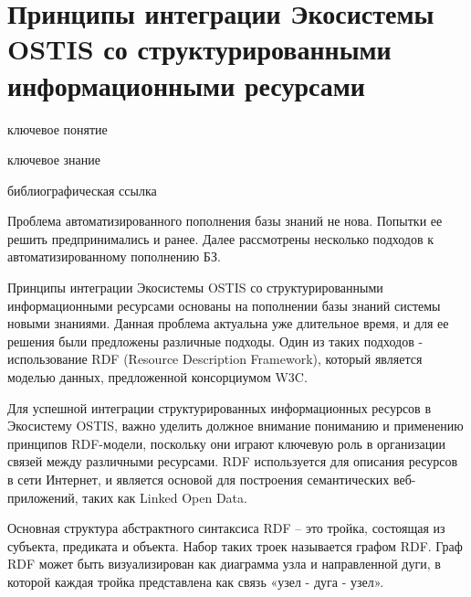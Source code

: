 \section{Принципы интеграции Экосистемы OSTIS со структурированными информационными ресурсами}
{\label{sec_integration_resources}} 

\begin{SCn}

    \bigskip
    
    \begin{scnrelfromlist}{ключевое понятие}
    \end{scnrelfromlist}
    
    \bigskip
    
    \begin{scnrelfromlist}{ключевое знание}
    \end{scnrelfromlist}
    
    \bigskip
    
    \begin{scnrelfromlist}{библиографическая ссылка}
    \end{scnrelfromlist}
    
    \end{SCn}

Проблема автоматизированного пополнения базы знаний не нова. Попытки ее решить предпринимались и ранее. Далее рассмотрены несколько подходов к автоматизированному пополнению БЗ.

Принципы интеграции Экосистемы OSTIS со структурированными информационными ресурсами основаны на пополнении базы знаний системы новыми знаниями. Данная проблема актуальна уже длительное время, и для ее решения были предложены различные подходы. Один из таких подходов - использование RDF (Resource Description Framework), который является моделью данных, предложенной консорциумом W3C.

Для успешной интеграции структурированных информационных ресурсов в Экосистему OSTIS, важно уделить должное внимание пониманию и применению принципов RDF-модели, поскольку они играют ключевую роль в организации связей между различными ресурсами. RDF используется для описания ресурсов в сети Интернет, и является основой для построения семантических веб-приложений, таких как Linked Open Data.

Основная структура абстрактного синтаксиса RDF – это тройка, состоящая из субъекта, предиката и объекта. Набор таких троек называется графом RDF. Граф RDF может быть визуализирован как диаграмма узла и направленной дуги, в которой каждая тройка представлена как связь «узел - дуга - узел».

